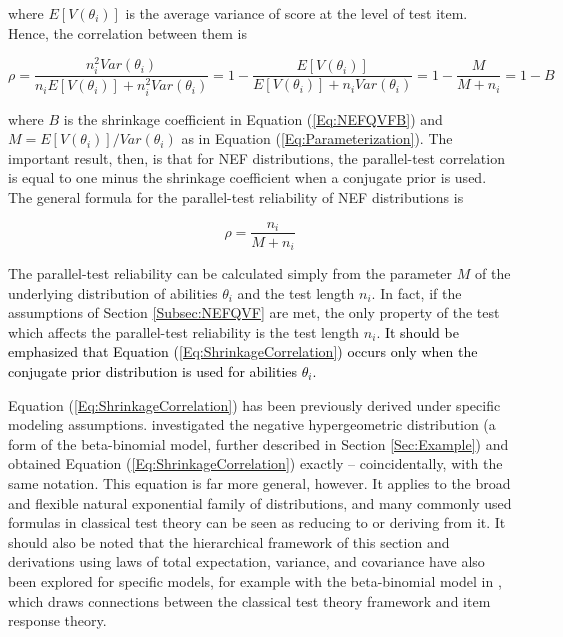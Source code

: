 \documentclass[12pt,epsfig]{article}
\newcommand{\change}[1]{\textcolor{black}{#1}}
\begin{document}
\noindent where $E[V(\theta_i)]$ is the average variance of score at the level of test item. Hence, the correlation between them is

\begin{equation}
\rho = \dfrac{n_i^2 Var(\theta_i)}{n_i E[V(\theta_i)] + n_i^2 Var(\theta_i)} = 1 - \dfrac{E[V(\theta_i)]}{E[V(\theta_i)] + n_i Var(\theta_i)} = 1 - \dfrac{M}{M + n_i} = 1 - B
\label{Eq:CorrelationAsShrinkage}
\end{equation}


\noindent where $B$ is the shrinkage coefficient in Equation (\ref{Eq:NEFQVFB}) and $M = E[V(\theta_i)]/Var(\theta_i)$ as in Equation (\ref{Eq:Parameterization}). The important result, then, is that for NEF distributions, the parallel-test correlation is equal to one minus the shrinkage coefficient when a conjugate prior is used. The general formula for the parallel-test reliability of NEF distributions is 


\begin{equation}
    \rho = \dfrac{n_i}{M + n_i}
    \label{Eq:ShrinkageCorrelation}
\end{equation}

\noindent The parallel-test reliability can be calculated simply from the parameter $M$ of the underlying distribution of abilities $\theta_i$ and the test length $n_i$. In fact, if the assumptions of Section \ref{Subsec:NEFQVF} are met, the only property of the test which affects the parallel-test reliability is the test length $n_i$. \change{It should be emphasized that Equation (\ref{Eq:ShrinkageCorrelation}) occurs only when the conjugate prior distribution is used for abilities $\theta_i$.}

Equation (\ref{Eq:ShrinkageCorrelation}) has been previously derived under specific modeling assumptions. \cite{Keats1962} investigated the negative hypergeometric distribution (a form of the beta-binomial model, further described in Section \ref{Sec:Example}) and obtained Equation (\ref{Eq:ShrinkageCorrelation}) exactly -- coincidentally, with the same notation. This equation is far more general, however. It applies to the broad and flexible natural exponential family of distributions, and many commonly used formulas in classical test theory can be seen as reducing to or deriving from it. It should also be noted that the hierarchical framework of this section and derivations using laws of total expectation, variance, and covariance have also been explored for specific models, for example with the beta-binomial model in \cite{Bechger2003}, which draws connections between the classical test theory framework and item response theory. 
\end{document}

